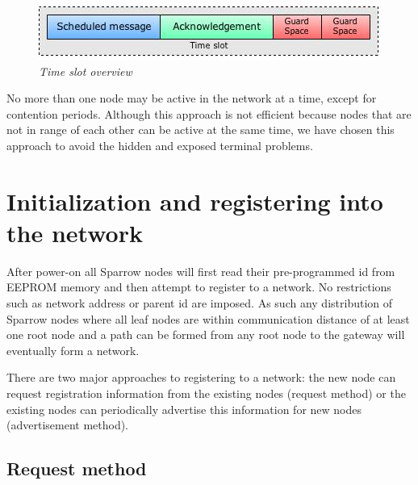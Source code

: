 \begin{figure}[ht]
	\begin{center}
		\includegraphics[width=\textwidth]{img/time_slot.jpg}
	\end{center}
	\caption{\small \itshape{Time slot overview}}
\end{figure}

No more than one node may be active in the network at a time, except for
contention periods. Although this approach is not efficient because nodes that
are not in range of each other can be active at the same time, we have chosen
this approach to avoid the hidden and exposed terminal
problems\cite{jayasuriya2004hidden}. 

\section{Initialization and registering into the network}
\label{sec:initialization_and_registering_into_the_network}

After power-on all Sparrow nodes will first read their pre-programmed id from
\mbox{EEPROM} memory and then attempt to register to a network. No restrictions
such as network address or parent id are imposed. As such any distribution of
Sparrow nodes where all leaf nodes are within communication distance of at
least one root node and a path can be formed from any root node to the gateway
will eventually form a network. 

There are two major approaches to registering to a network: the new node can
request registration information from the existing nodes (request method) or
the existing nodes can periodically advertise this information for new nodes
(advertisement method). 

\subsection{Request method}

